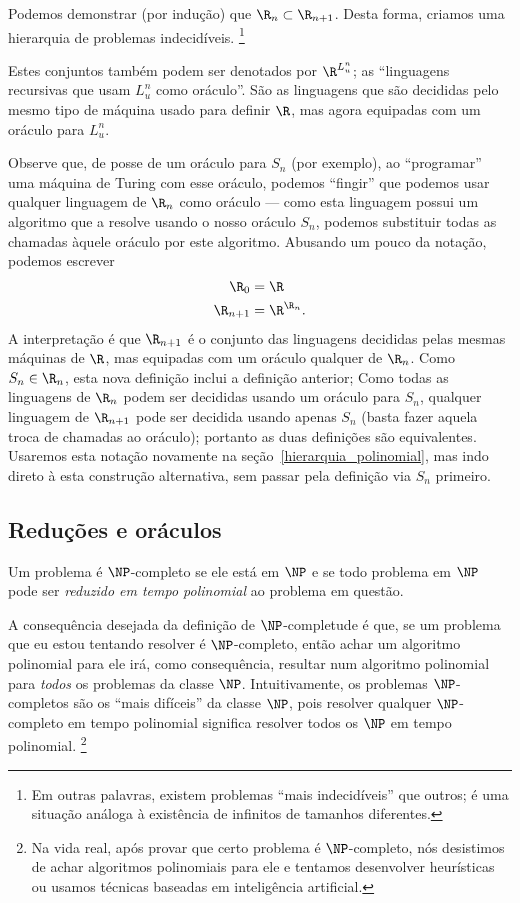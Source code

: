 Podemos demonstrar (por indução) que $\R_n \subset \R_{n+1}$.
Desta forma,
criamos uma hierarquia de problemas indecidíveis.
\footnote{
    Em outras palavras,
    existem problemas ``mais indecidíveis'' que outros;
    é uma situação análoga à existência de infinitos de tamanhos diferentes.
}

Estes conjuntos também podem ser denotados por $\R^{L_u^n}$;
as ``linguagens recursivas que usam $L_u^n$ como oráculo''.
São as linguagens que são decididas
pelo mesmo tipo de máquina usado para definir $\R$,
mas agora equipadas com um oráculo para $L_u^n$.

Observe que,
de posse de um oráculo para $S_n$ (por exemplo),
ao ``programar'' uma máquina de Turing com esse oráculo,
podemos ``fingir'' que podemos usar qualquer linguagem de $\R_n$ como oráculo
--- como esta linguagem possui um algoritmo que a resolve
usando o nosso oráculo $S_n$,
podemos substituir todas as chamadas àquele oráculo
por este algoritmo.
Abusando um pouco da notação,
podemos escrever
\begin{equation}
    \begin{aligned}
        \R_0 &= \R \\
        \R_{n+1} &= \R^{\R_n}.
    \end{aligned}
    \label{abuso_notacao_oraculos}
\end{equation}
A interpretação é que $\R_{n+1}$ é o conjunto das linguagens
decididas pelas mesmas máquinas de $\R$,
mas equipadas com um oráculo qualquer de $\R_n$.
Como $S_n \in \R_n$, esta nova definição inclui a definição anterior;
Como todas as linguagens de $\R_n$ podem ser decididas usando um oráculo para $S_n$,
qualquer linguagem de $\R_{n+1}$
pode ser decidida usando apenas $S_n$
(basta fazer aquela troca de chamadas ao oráculo);
portanto as duas definições são equivalentes.
Usaremos esta notação novamente na seção~\ref{hierarquia_polinomial},
mas indo direto à esta construção alternativa,
sem passar pela definição via $S_n$ primeiro.

\subsection{Reduções e oráculos}

Um problema é $\NP$-completo se
ele está em $\NP$
e se todo problema em $\NP$ pode ser \emph{reduzido em tempo polinomial}
ao problema em questão.

A consequência desejada da definição de $\NP$-completude é que,
se um problema que eu estou tentando resolver é $\NP$-completo,
então achar um algoritmo polinomial para ele
irá, como consequência,
resultar num algoritmo polinomial para \emph{todos} os problemas da classe $\NP$.
Intuitivamente,
os problemas $\NP$-completos são os ``mais difíceis'' da classe $\NP$,
pois resolver qualquer $\NP$-completo em tempo polinomial
significa resolver todos os $\NP$ em tempo polinomial.
\footnote{
    Na vida real,
    após provar que certo problema é $\NP$-completo,
    nós desistimos de achar algoritmos polinomiais para ele
    e tentamos desenvolver heurísticas
    ou usamos técnicas baseadas em inteligência artificial.
}

